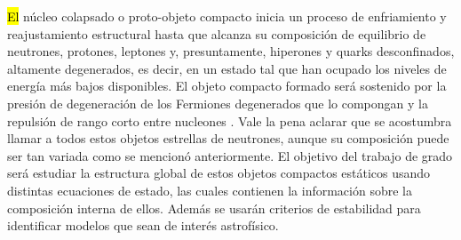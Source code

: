 \hl{El} núcleo colapsado o proto-objeto compacto inicia un proceso de enfriamiento y reajustamiento estructural hasta que alcanza su composición de equilibrio de neutrones, protones, leptones y, presuntamente, hiperones y quarks desconfinados, altamente degenerados, es decir, en un estado tal que han ocupado los niveles de energía más bajos disponibles. El objeto compacto formado será sostenido por la presión de degeneración de los Fermiones degenerados que lo compongan y la repulsión de rango corto entre nucleones \cite{Piekarewicz2013}. Vale la pena aclarar que se acostumbra llamar a todos estos objetos estrellas de neutrones, aunque su composición puede ser tan variada como se mencionó anteriormente.     
El objetivo del trabajo de grado será estudiar la estructura global de estos objetos compactos estáticos usando distintas ecuaciones de estado, las cuales contienen la información sobre la composición interna de ellos. Además se usarán criterios de estabilidad para identificar modelos que sean de interés astrofísico.  
